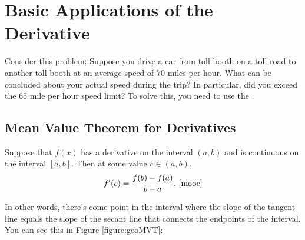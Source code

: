 \chapter{Basic Applications of the Derivative}

Consider this problem: Suppose you drive a car from toll booth on a toll road to another toll booth at an average speed of 70 miles per hour. What can be concluded about your actual speed during the trip? In particular, did you exceed the 65 mile per hour speed limit? To solve this, you need to use the .

\section{Mean Value Theorem for Derivatives}
\hfil
\begin{theorem} \hfil
    \label{thm:mvt}
    Suppose that $f(x)$ has a derivative on the
    interval $(a,b)$ and is continuous on the interval $[a,b]$. 
    Then at some value $c\in (a,b)$,
    $$f'(c)={f(b)-f(a)\over b-a}.\text{ \cite{mooc}}$$
\end{theorem}

In other words, there's come point in the interval where the slope of the tangent line equals the slope of the secant line that connects the endpoints of the interval. You can see this in Figure \ref{figure:geoMVT}:

